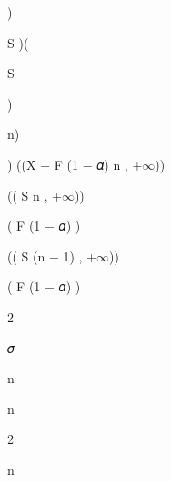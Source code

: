 \documentclass[a4paper,portrait,12pt]{article}
\begin{document}
)


\begin{flushleft}
S )(
\end{flushleft}


\begin{flushleft}
S
\end{flushleft}


)


\begin{flushleft}
n)
\end{flushleft}


\begin{flushleft}
) ((X $-$ F (1 $-$ 𝛼) n , +$\infty$))
\end{flushleft}


\begin{flushleft}
(( S n , +$\infty$))
\end{flushleft}


\begin{flushleft}
( F (1 $-$ 𝛼) )
\end{flushleft}


\begin{flushleft}
(( S (n $-$ 1) , +$\infty$))
\end{flushleft}


\begin{flushleft}
( F (1 $-$ 𝛼) )
\end{flushleft}


2





\begin{flushleft}
𝜎
\end{flushleft}


\begin{flushleft}
n
\end{flushleft}





\begin{flushleft}
n
\end{flushleft}





2





\begin{flushleft}
n
\end{flushleft}
\end{document}
